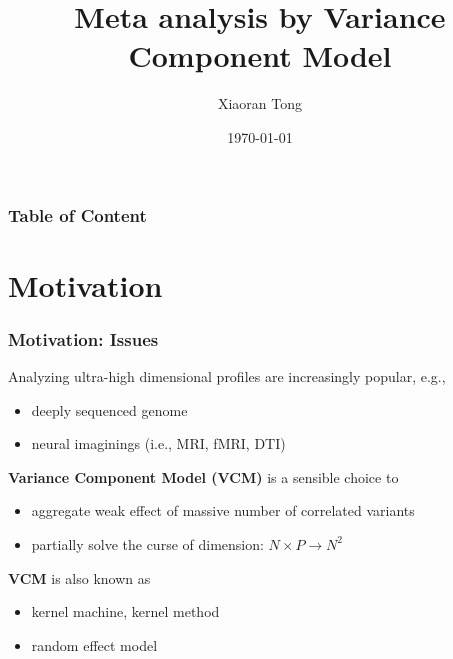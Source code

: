 \documentclass{beamer}
\title[Meta-VCM]{Meta analysis by Variance Component Model}
\author{Xiaoran Tong} %
\institute[EPI Biosta,
MSU] %
{ Michigan State University \\ %
  \medskip \textit{tongxia1@msu.edu} \\%
  \textit{qlu@epi.msu.edu} %
} \date{\today} %
\begin{document}
\begin{frame}
  \titlepage %
\end{frame}

\begin{frame}
  \frametitle{Table of
    Content} %
  \tableofcontents
\end{frame}
\section{Motivation}
\begin{frame}\frametitle{Motivation: Issues}
  Analyzing ultra-high dimensional profiles are increasingly popular,
  e.g.,
  \begin{itemize}
  \item deeply sequenced genome
  \item neural imaginings (i.e., MRI, fMRI, DTI)
  \end{itemize}
  \textbf{Variance Component Model (VCM)} is a sensible choice to
  \begin{itemize}
  \item aggregate weak effect of massive number of correlated variants
  \item partially solve the curse of dimension: $N \times P \to N^2$
  \end{itemize}
  \textbf{VCM} is also known as
  \begin{itemize}
  \item kernel machine, kernel method
  \item random effect model
  \end{itemize}
\end{frame}
\newcommand{\fit}[1]{{\color{magenta}{#1}}}
\newcommand{\blue}[1]{{\color{blue}{#1}}}
\newcommand{\red}[1]{{\color{red}{#1}}}
\newcommand{\green}[1]{{\color{green}{#1}}}
\end{document}
